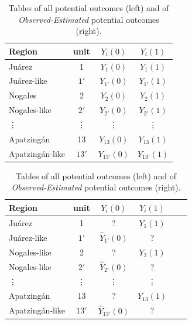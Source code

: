 \documentclass{article}[11 pt]
\begin{document}
		\begin{table}[htdp]
		\begin{minipage}[b]{0.3\linewidth}
		    \scriptsize 
	        \begin{tabular}{|l|c|c|c|}
	            \hline
	            Region& unit& $Y_i(0)$&$Y_i(1)$\\
	            \hline
	            Ju\'{a}rez&1&$Y_1(0)$&$Y_1(1)$ \\
				 Ju\'{a}rez-like&$1'$&$Y_{1'}(0)$&$Y_{1'}(1)$ \\
				\hline
				Nogales&2&$Y_2(0)$&$Y_2(1)$ \\
				 	Nogales-like&$2'$&$Y_{2'}(0)$&$Y_{2'}(1)$ \\
				\hline
				\vdots&\vdots&\vdots&\vdots \\
				\hline
	            Apatzing\'{a}n&13&$Y_{13}(0)$&$Y_{13}(1)$ \\
				 Apatzing\'{a}n-like&$13'$&$Y_{{13}'}(0)$&$Y_{{13}'}(1)$  \\
	            \hline

	\end{tabular}
\end{minipage}
\hspace{0.9cm}
\begin{minipage}[b]{0.3\linewidth}
		    \scriptsize
		        \begin{tabular}{|l|c|c|c|c|c|}
		            \hline
		            Region& unit& $Y_i(0)$&$Y_i(1)$\\
		            \hline
		            Ju\'{a}rez&1&?&$Y_1(1)$ \\
					 Ju\'{a}rez-like&$1'$&$\hat{Y}_{1'}(0)$&? \\
					\hline
					Nogales-like&2&?&$Y_2(1)$ \\
						Nogales-like &$2'$&$\hat{Y}_{2'}(0)$&? \\
						\hline
					\vdots&\vdots&\vdots&\vdots \\
					\hline
		            Apatzing\'{a}n&13&?&$Y_{13}(1)$ \\
					 Apatzing\'{a}n-like&$13'$&$\hat{Y}_{13'}(0)$&? \\
		            \hline
		        \end{tabular}

					\end{minipage}
					   \caption{Tables of all potential outcomes (left)  and of \emph{Observed-Estimated} potential outcomes (right).}
    \label{Tab3}
\end{table}			
\end{document}
